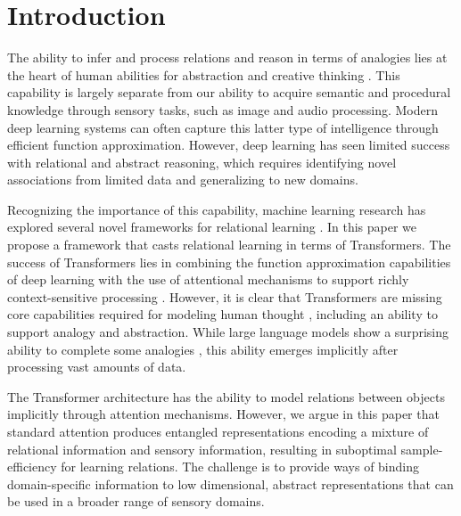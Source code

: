 \section{Introduction}

The ability to infer and process relations and reason in terms 
of analogies lies at the heart of human abilities for abstraction and creative thinking
\citep{snow,holyoak}. This capability is 
largely separate from our ability to acquire semantic and procedural 
knowledge through sensory tasks, such as image and audio processing. Modern 
deep learning systems can often capture this latter type of intelligence 
through efficient function approximation. However, deep learning has 
seen limited success with relational and abstract reasoning, which 
requires identifying novel associations from limited data
and generalizing to new domains. 

Recognizing the importance of this capability,
machine learning research has explored several novel frameworks for relational learning 
\citep{TEM, NTM,episodicControl,shanahanExplicitlyRelationalNeural,esbn,mondal23learned,battaglia,barrett:2018,santoro1}. 
In this paper we propose a framework that casts relational learning in terms of Transformers. 
The success of Transformers lies in combining the function approximation capabilities of deep learning with the use
of attentional mechanisms to support richly context-sensitive processing \citep{transformers,vaswani2017attention,
    kerg2020untangling}. However, it is clear that Transformers are missing core capabilities required for modeling
human thought \citep{mahowald2023dissociating}, including an ability to support analogy and abstraction.
While large language models show a surprising ability to complete some analogies \citep{webb}, this ability
emerges implicitly after processing vast amounts of data.

The Transformer architecture has the ability to model relations between objects implicitly through attention mechanisms. However, we argue in this paper that standard attention produces entangled representations encoding a mixture of relational information and sensory information, resulting in suboptimal sample-efficiency for learning relations. The challenge is to provide ways of binding
domain-specific information to low dimensional, abstract representations 
that can be used in a broader range of sensory domains.

